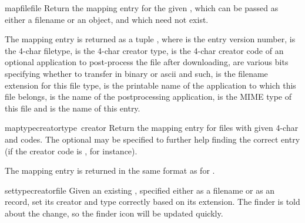 \begin{funcdesc}{mapfile}{file}
Return the mapping entry for the given , which can be passed
as either a filename or an  object, and which need not
exist.

The mapping entry is returned as a tuple , where  is the entry version
number,  is the 4-char filetype,  is the 4-char
creator type,  is the 4-char creator code of an
optional application to post-process the file after downloading,
 are various bits specifying whether to transfer in binary
or ascii and such,  is the filename extension for this
file type,  is the printable name of the application to
which this file belongs,  is the name of the
postprocessing application,  is the MIME type of this
file and  is the name of this entry.
\end{funcdesc}

\begin{funcdesc}{maptypecreator}{type\, creator }
Return the mapping entry for files with given 4-char  and
 codes. The optional  may be specified to
further help finding the correct entry (if the creator code is
, for instance).

The mapping entry is returned in the same format as for .
\end{funcdesc}

\begin{funcdesc}{settypecreator}{file}
Given an existing , specified either as a filename or as an
 record, set its creator and type correctly based on its
extension. The finder is told about the change, so the finder icon
will be updated quickly.
\end{funcdesc}
